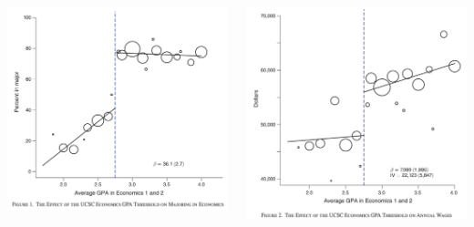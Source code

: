 \documentclass[aspectratio=169,t,11pt,table]{beamer}
\begin{document}
\begin{frame}{}
  \begin{columns}[T]
    \begin{column}{.5\textwidth}\vspace*{-\bigskipamount}
      \includegraphics[width = \textwidth]{figures/bleemer_mehta_1.png}
    \end{column}
    \begin{column}{.5\textwidth}\vspace*{-\bigskipamount}
      \includegraphics[width = \textwidth]{figures/bleemer_mehta_2.png}
    \end{column}
  \end{columns}
\end{frame}
\end{document}
